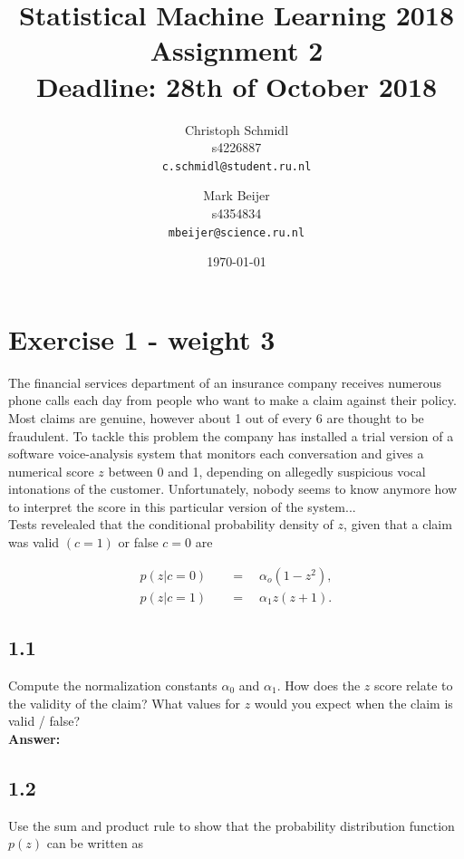 \documentclass[a4paper]{article}
\title{Statistical Machine Learning 2018\\Assignment 2\\Deadline: 28th of October 2018}
\author{
  Christoph Schmidl\\ s4226887\\      \texttt{c.schmidl@student.ru.nl}
  \and
  Mark Beijer\\ s4354834\\     \texttt{mbeijer@science.ru.nl}
}
\date{\today}
\begin{document}
\maketitle


\section*{Exercise 1 - weight 3}

The financial services department of an insurance company receives numerous phone calls each day from people who want to make a claim against their policy. Most claims are genuine, however about 1 out of every 6 are thought to be fraudulent. To tackle this problem the company has installed a trial version of a software voice-analysis system that monitors each conversation and gives a numerical score $z$ between 0 and 1, depending on allegedly suspicious vocal intonations of the customer. Unfortunately, nobody seems to know anymore how to interpret the score in this particular version of the system...\\

Tests revelealed that the conditional probability density of $z$, given that a claim was valid $(c = 1)$ or false $c = 0$ are 

\begin{align*}
p(z | c = 0) \quad &= \quad \alpha_o(1 - z^2),\\
p(z | c = 1) \quad &= \quad \alpha_1z(z + 1).
\end{align*}



\subsection*{1.1}

Compute the normalization constants $\alpha_0$ and $\alpha_1$. How does the $z$ score relate to the validity of the claim? What values for $z$ would you expect when the claim is valid / false?\\

\textbf{Answer:}\\



\subsection*{1.2}

Use the sum and product rule to show that the probability distribution function $p(z)$ can be written as 
\end{document}
